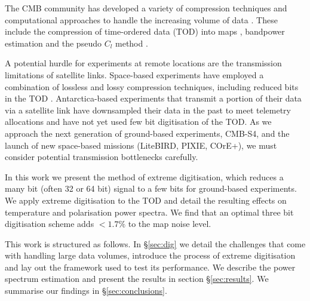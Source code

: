 \documentclass[apj]{emulateapj}
\begin{document}
The CMB community has developed a variety of compression techniques and computational approaches to handle the increasing volume of data \citep{tristam2007}. These include the compression of time-ordered data (TOD) into maps \citep{tegmark1997}, bandpower estimation \citep{tegmark1998} and the pseudo $C_l$ method \citep{brown2005}.

A potential hurdle for experiments at remote locations are the transmission limitations of satellite links. Space-based experiments have employed a combination of lossless and lossy compression techniques, including reduced bits in the TOD \citep{gaztanaga1998, maris2003}. Antarctica-based experiments that transmit a portion of their data via a satellite link have downsampled their data in the past to meet telemetry allocations and have not yet used few bit digitisation of the TOD. As we approach the next generation of ground-based experiments, CMB-S4, and the launch of new space-based missions (LiteBIRD, PIXIE, COrE+), we must consider potential transmission bottlenecks carefully. %

In this work we present the method of extreme digitisation, which reduces a many bit (often 32 or 64 bit) signal to a few bits for ground-based experiments. We apply extreme digitisation to the TOD and detail the resulting effects on temperature and polarisation power spectra. We find that an optimal three bit digitisation scheme adds $<1.7\%$ to the map noise level.

This work is structured as follows. In \S\ref{sec:dig} we detail the challenges that come with handling large data volumes, introduce the process of extreme digitisation and lay out the framework used to test its performance. We describe the power spectrum estimation and present the results in section \S\ref{sec:results}. We summarise our findings in \S\ref{sec:conclusions}.


\end{document}
